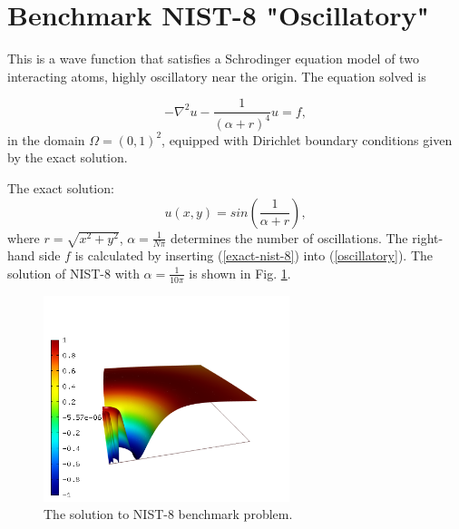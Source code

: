 \section{Benchmark NIST-8 "Oscillatory"}
\label{sec:bench-8}

This is a wave function that satisfies a Schrodinger equation model of two
interacting atoms, highly oscillatory near the origin.
The equation solved is

\begin{equation} \label{oscillatory}
-\nabla^{2} u - \frac{1}{(\alpha + r)^{4}} u = f,
\end{equation}
in the domain $\Omega = (0, 1)^2$, equipped with Dirichlet boundary conditions
given by the exact solution.

The exact solution:
\begin{equation}\label{exact-nist-8}
u(x,y) = sin(\frac{1}{\alpha + r}),
\end{equation}
where $r = \sqrt{x^{2} + y^{2}}$, $\alpha = \frac{1}{N \pi}$ determines the number of oscillations.
The right-hand side $f$ is calculated by inserting (\ref{exact-nist-8}) into (\ref{oscillatory}).
The solution of NIST-8 with $\alpha = \frac{1}{10 \pi}$ is shown in Fig. \ref{fig:sln-nist08}.

\begin{figure}[!ht]
\centering
\includegraphics[height=6cm]{nist/nist-8/solution.png}
\caption{The solution to NIST-8 benchmark problem.}
\label{fig:sln-nist08}
\end{figure}
